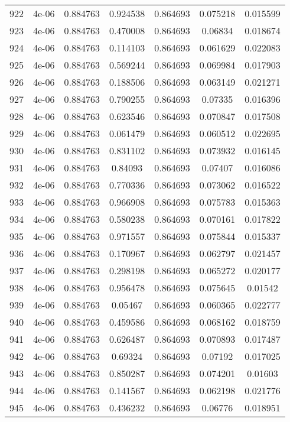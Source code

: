 \begin{table}
\begin{tabular*}{\linewidth}{c|c|c|c|c|c|c}
922 & 4e-06 & 0.884763 & 0.924538 & 0.864693 & 0.075218 & 0.015599\\
923 & 4e-06 & 0.884763 & 0.470008 & 0.864693 & 0.06834 & 0.018674\\
924 & 4e-06 & 0.884763 & 0.114103 & 0.864693 & 0.061629 & 0.022083\\
925 & 4e-06 & 0.884763 & 0.569244 & 0.864693 & 0.069984 & 0.017903\\
926 & 4e-06 & 0.884763 & 0.188506 & 0.864693 & 0.063149 & 0.021271\\
927 & 4e-06 & 0.884763 & 0.790255 & 0.864693 & 0.07335 & 0.016396\\
928 & 4e-06 & 0.884763 & 0.623546 & 0.864693 & 0.070847 & 0.017508\\
929 & 4e-06 & 0.884763 & 0.061479 & 0.864693 & 0.060512 & 0.022695\\
930 & 4e-06 & 0.884763 & 0.831102 & 0.864693 & 0.073932 & 0.016145\\
931 & 4e-06 & 0.884763 & 0.84093 & 0.864693 & 0.07407 & 0.016086\\
932 & 4e-06 & 0.884763 & 0.770336 & 0.864693 & 0.073062 & 0.016522\\
933 & 4e-06 & 0.884763 & 0.966908 & 0.864693 & 0.075783 & 0.015363\\
934 & 4e-06 & 0.884763 & 0.580238 & 0.864693 & 0.070161 & 0.017822\\
935 & 4e-06 & 0.884763 & 0.971557 & 0.864693 & 0.075844 & 0.015337\\
936 & 4e-06 & 0.884763 & 0.170967 & 0.864693 & 0.062797 & 0.021457\\
937 & 4e-06 & 0.884763 & 0.298198 & 0.864693 & 0.065272 & 0.020177\\
938 & 4e-06 & 0.884763 & 0.956478 & 0.864693 & 0.075645 & 0.01542\\
939 & 4e-06 & 0.884763 & 0.05467 & 0.864693 & 0.060365 & 0.022777\\
940 & 4e-06 & 0.884763 & 0.459586 & 0.864693 & 0.068162 & 0.018759\\
941 & 4e-06 & 0.884763 & 0.626487 & 0.864693 & 0.070893 & 0.017487\\
942 & 4e-06 & 0.884763 & 0.69324 & 0.864693 & 0.07192 & 0.017025\\
943 & 4e-06 & 0.884763 & 0.850287 & 0.864693 & 0.074201 & 0.01603\\
944 & 4e-06 & 0.884763 & 0.141567 & 0.864693 & 0.062198 & 0.021776\\
945 & 4e-06 & 0.884763 & 0.436232 & 0.864693 & 0.06776 & 0.018951\\
\end{tabular*}
\end{table}

